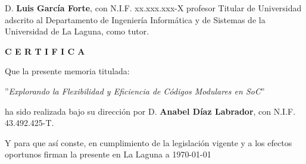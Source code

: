 \newpage
\thispagestyle{empty}

D. {\bf Luis García Forte}, con N.I.F. xx.xxx.xxx-X profesor Titular de Universidad adscrito al Departamento de Ingenier\'ia Inform\'atica y de Sistemas de la Universidad de La Laguna, como tutor.


\bigskip
\bigskip
{\bf C E R T I F I C A}

\bigskip
\bigskip
Que la presente memoria titulada:

\bigskip
''{\it Explorando la Flexibilidad y Eficiencia de Códigos Modulares en SoC}''

\bigskip
\bigskip
\bigskip

\noindent ha sido realizada bajo su dirección por D. {\bf Anabel D\'iaz Labrador},
con N.I.F. 43.492.425-T.

\bigskip
\bigskip

Y para que así conste, en cumplimiento de la legislación vigente y a los efectos
oportunos firman la presente en La Laguna a \today